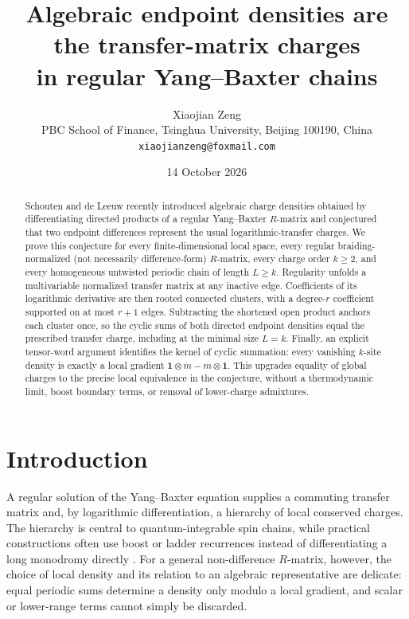 \documentclass[11pt,a4paper]{article}
\title{Algebraic endpoint densities are the transfer-matrix charges\\
in regular Yang--Baxter chains}
\author{Xiaojian Zeng\\
\small PBC School of Finance, Tsinghua University, Beijing 100190, China\\
\small \texttt{xiaojianzeng@foxmail.com}}
\date{14 October 2026}
\theoremstyle{definition}
\theoremstyle{remark}
\begin{document}
\maketitle

\begin{abstract}
Schouten and de Leeuw recently introduced algebraic charge densities obtained by
differentiating directed products of a regular Yang--Baxter $R$-matrix and conjectured
that two endpoint differences represent the usual logarithmic-transfer charges.  We
prove this conjecture for every finite-dimensional local space, every regular
braiding-normalized (not necessarily difference-form) $R$-matrix, every charge order
$k\geq2$, and every homogeneous untwisted periodic chain of length $L\geq k$.
Regularity unfolds a multivariable normalized transfer matrix at any inactive edge.
Coefficients of its logarithmic derivative are then rooted connected clusters, with a
degree-$r$ coefficient supported on at most $r+1$ edges.  Subtracting the shortened
open product anchors each cluster once, so the cyclic sums of both directed endpoint
densities equal the prescribed transfer charge, including at the minimal size $L=k$.
Finally, an explicit tensor-word argument identifies the kernel of cyclic summation:
every vanishing $k$-site density is exactly a local gradient
$\mathbf 1\otimes m-m\otimes\mathbf 1$.  This upgrades equality of global charges to
the precise local equivalence in the conjecture, without a thermodynamic limit, boost
boundary terms, or removal of lower-charge admixtures.
\end{abstract}

\section{Introduction}

A regular solution of the Yang--Baxter equation supplies a commuting transfer matrix
and, by logarithmic differentiation, a hierarchy of local conserved charges.  The
hierarchy is central to quantum-integrable spin chains, while practical constructions
often use boost or ladder recurrences instead of differentiating a long monodromy
directly \cite{Tetelman1982,Links2001,TakizawaLinks2002,Bargheer2009,deLeeuw2021}.
For a general non-difference $R$-matrix, however, the choice of local density and its
relation to an algebraic representative are delicate: equal periodic sums determine
a density only modulo a local gradient, and scalar or lower-range terms cannot simply
be discarded.
\end{document}
